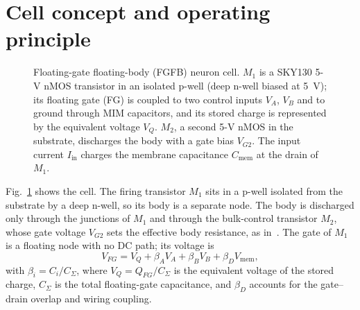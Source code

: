 \documentclass[a4paper,fleqn]{cas-dc}
\begin{document}
\section{Cell concept and operating principle}
\label{sec:cell}

\begin{figure}[t]
\centering
\resizebox{\linewidth}{!}{}
\caption{Floating-gate floating-body (FGFB) neuron cell. $M_1$ is a SKY130 5-V nMOS transistor in an isolated p-well (deep n-well biased at \SI{5}{V}); its floating gate (FG) is coupled to two control inputs $V_A$, $V_B$ and to ground through MIM capacitors, and its stored charge is represented by the equivalent voltage $V_Q$. $M_2$, a second 5-V nMOS in the substrate, discharges the body with a gate bias $V_{G2}$. The input current $I_{\mathrm{in}}$ charges the membrane capacitance $C_{\mathrm{mem}}$ at the drain of $M_1$.}
\label{fig:schematic}
\end{figure}

Fig.~\ref{fig:schematic} shows the cell. The firing transistor $M_1$ sits in a p-well isolated from the substrate by a deep n-well, so its body is a separate node. The body is discharged only through the junctions of $M_1$ and through the bulk-control transistor $M_2$, whose gate voltage $V_{G2}$ sets the effective body resistance, as in~\cite{pazos2025}. The gate of $M_1$ is a floating node with no DC path; its voltage is
\begin{equation}
V_{FG} = V_Q + \beta_A V_A + \beta_B V_B + \beta_D V_{\mathrm{mem}},
\label{eq:vfg}
\end{equation}
with $\beta_i = C_i/C_{\Sigma}$, where $V_Q = Q_{FG}/C_\Sigma$ is the equivalent voltage of the stored charge, $C_\Sigma$ is the total floating-gate capacitance, and $\beta_D$ accounts for the gate--drain overlap and wiring coupling.
\end{document}
